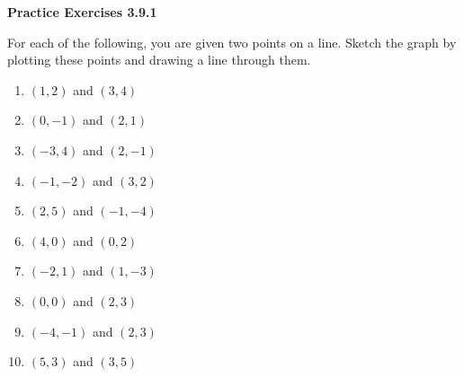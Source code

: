  \vspace{1ex}
\noindent\textbf{Practice Exercises 3.9.1}

\vspace{0.75ex}

For each of the following, you are given two points on a line. Sketch the graph by plotting these points and drawing a line through them.
\begin{multicols}{2}
\begin{enumerate}[noitemsep, label = \color{blue}\arabic*. ]
    \item $(1, 2)$ and $(3, 4)$
    \item $(0, -1)$ and $(2, 1)$
    \item $(-3, 4)$ and $(2, -1)$
    \item $(-1, -2)$ and $(3, 2)$
    \item $(2, 5)$ and $(-1, -4)$
    \item $(4, 0)$ and $(0, 2)$
    \item $(-2, 1)$ and $(1, -3)$
    \item $(0, 0)$ and $(2, 3)$
    \item $(-4, -1)$ and $(2, 3)$
    \item $(5, 3)$ and $(3, 5)$
\end{enumerate}
\end{multicols}
